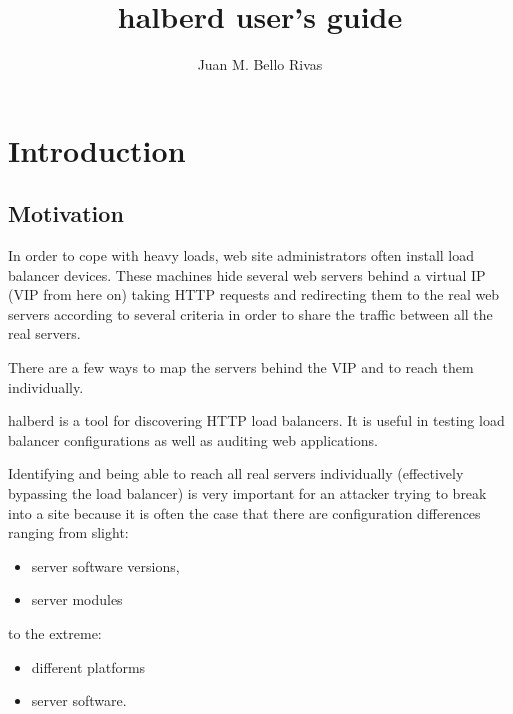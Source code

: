 \documentclass[a4paper]{book}
\begin{document}
\title{\Large \bf halberd user's guide}
\author{Juan M. Bello Rivas}
\date{}
\maketitle

\tableofcontents


\chapter{Introduction}

\section{Motivation}

In order to cope with heavy loads, web site administrators often install load
balancer devices.  These machines hide several web servers behind a virtual IP
(VIP from here on) taking HTTP requests and redirecting them to the real web
servers according to several criteria in order to share the traffic between all
the real servers.

There are a few ways to map the servers behind the VIP and to reach them
individually.

halberd is a tool for discovering HTTP load balancers. It is useful in testing
load balancer configurations as well as auditing web applications.

Identifying and being able to reach all real servers individually (effectively
bypassing the load balancer) is very important for an attacker trying to break
into a site because it is often the case that there are configuration
differences ranging from slight:

\begin{itemize}
  \item server software versions,
  \item server modules
\end{itemize}

to the extreme:

\begin{itemize}
  \item different platforms
  \item server software.
\end{itemize}
\end{document}
